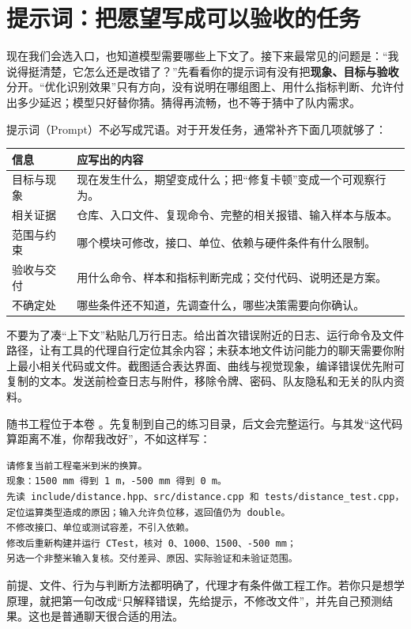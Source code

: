 \section{提示词：把愿望写成可以验收的任务}
\label{sec:ai-prompts}

现在我们会选入口，也知道模型需要哪些上下文了。接下来最常见的问题是：“我说得挺清楚，它怎么还是改错了？”先看看你的提示词有没有把\textbf{现象、目标与验收}分开。“优化识别效果”只有方向，没有说明在哪组图上、用什么指标判断、允许付出多少延迟；模型只好替你猜。猜得再流畅，也不等于猜中了队内需求。

提示词（Prompt）不必写成咒语。对于开发任务，通常补齐下面几项就够了：
\begin{center}
\begin{tabular}{p{}p{}}
\toprule
信息 & 应写出的内容 \\
\midrule
目标与现象 & 现在发生什么，期望变成什么；把“修复卡顿”变成一个可观察行为。\\
相关证据 & 仓库、入口文件、复现命令、完整的相关报错、输入样本与版本。\\
范围与约束 & 哪个模块可修改，接口、单位、依赖与硬件条件有什么限制。\\
验收与交付 & 用什么命令、样本和指标判断完成；交付代码、说明还是方案。\\
不确定处 & 哪些条件还不知道，先调查什么，哪些决策需要向你确认。\\
\bottomrule
\end{tabular}
\end{center}

不要为了凑“上下文”粘贴几万行日志。给出首次错误附近的日志、运行命令及文件路径，让有工具的代理自行定位其余内容；未获本地文件访问能力的聊天需要你附上最小相关代码或文件。截图适合表达界面、曲线与视觉现象，编译错误优先附可复制的文本。发送前检查日志与附件，移除令牌、密码、队友隐私和无关的队内资料。

\begin{example}
随书工程位于本卷 。先复制到自己的练习目录，后文会完整运行。与其发“这代码算距离不准，你帮我改好”，不如这样写：
\begin{lstlisting}[language={}]
请修复当前工程毫米到米的换算。
现象：1500 mm 得到 1 m，-500 mm 得到 0 m。
先读 include/distance.hpp、src/distance.cpp 和 tests/distance_test.cpp，
定位运算类型造成的原因；输入允许负位移，返回值仍为 double。
不修改接口、单位或测试容差，不引入依赖。
修改后重新构建并运行 CTest，核对 0、1000、1500、-500 mm；
另选一个非整米输入复核。交付差异、原因、实际验证和未验证范围。
\end{lstlisting}
前提、文件、行为与判断方法都明确了，代理才有条件做工程工作。若你只是想学原理，就把第一句改成“只解释错误，先给提示，不修改文件”，并先自己预测结果。这也是普通聊天很合适的用法。
\end{example}

